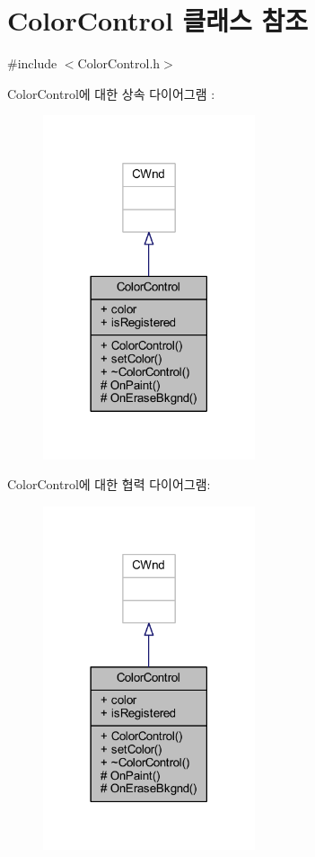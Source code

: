\hypertarget{class_color_control}{}\section{Color\+Control 클래스 참조}
\label{class_color_control}


{\ttfamily \#include $<$Color\+Control.\+h$>$}



Color\+Control에 대한 상속 다이어그램 \+: \nopagebreak
\begin{figure}[H]
\begin{center}
\leavevmode
\includegraphics[width=177pt]{class_color_control__inherit__graph}
\end{center}
\end{figure}


Color\+Control에 대한 협력 다이어그램\+:\nopagebreak
\begin{figure}[H]
\begin{center}
\leavevmode
\includegraphics[width=177pt]{class_color_control__coll__graph}
\end{center}
\end{figure}
